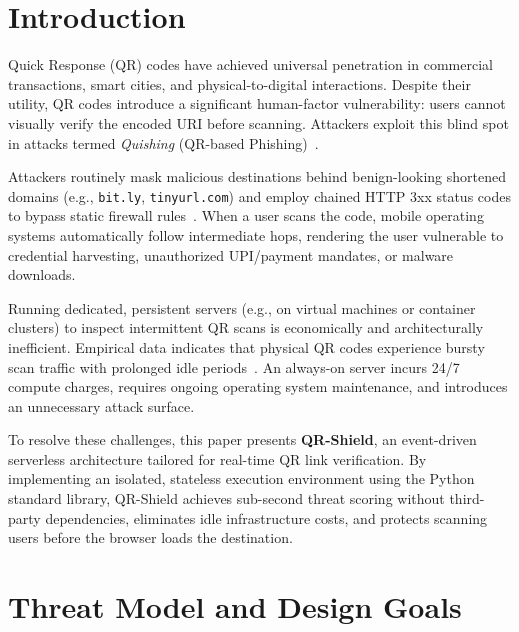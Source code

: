 \documentclass[10pt,conference,letterpaper]{IEEEtran}
\begin{document}
\section{Introduction}
Quick Response (QR) codes have achieved universal penetration in commercial transactions, smart cities, and physical-to-digital interactions. Despite their utility, QR codes introduce a significant human-factor vulnerability: users cannot visually verify the encoded URI before scanning. Attackers exploit this blind spot in attacks termed \emph{Quishing} (QR-based Phishing)~\cite{stamm2007driveby, valles2023quishing}.

Attackers routinely mask malicious destinations behind benign-looking shortened domains (e.g., \texttt{bit.ly}, \texttt{tinyurl.com}) and employ chained HTTP 3xx status codes to bypass static firewall rules~\cite{nikiforakis2014stranger}. When a user scans the code, mobile operating systems automatically follow intermediate hops, rendering the user vulnerable to credential harvesting, unauthorized UPI/payment mandates, or malware downloads.

Running dedicated, persistent servers (e.g., on virtual machines or container clusters) to inspect intermittent QR scans is economically and architecturally inefficient. Empirical data indicates that physical QR codes experience bursty scan traffic with prolonged idle periods~\cite{jonas2019serverless}. An always-on server incurs 24/7 compute charges, requires ongoing operating system maintenance, and introduces an unnecessary attack surface.

To resolve these challenges, this paper presents \textbf{QR-Shield}, an event-driven serverless architecture tailored for real-time QR link verification. By implementing an isolated, stateless execution environment using the Python standard library, QR-Shield achieves sub-second threat scoring without third-party dependencies, eliminates idle infrastructure costs, and protects scanning users before the browser loads the destination.

\section{Threat Model and Design Goals}
\end{document}
